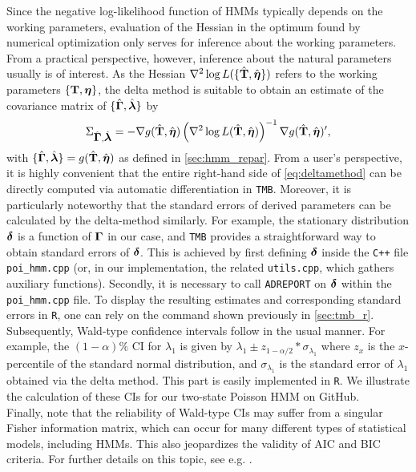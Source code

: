 \documentclass[bimj,fleqn]{w-art}\usepackage[]{graphicx}\usepackage[]{color}
\newcommand{\bct}{{\bf T}}
\newcommand{\bgamma}{\mbox{\boldmath $\Gamma$}}
\newcommand{\bfeta}{\mbox{\boldmath $\eta$}}
\newcommand{\bfdelta}{\mbox{\boldmath $\delta$}}
\newcommand{\bflambda}{\mbox{\boldmath $\lambda$}}
\theoremstyle{plain}
\theoremstyle{definition}
\begin{document}
Since the negative log-likelihood function of HMMs typically depends on the working parameters, evaluation of the Hessian in the optimum found by numerical optimization only serves for inference about the working parameters. From a practical perspective, however, inference about the natural parameters usually is of interest. As the Hessian $\nabla^2\log L(\{\hat{\bct}, \hat{\bfeta}\})$ refers to the working parameters $\{\bct, \bfeta\}$, the delta method is suitable to obtain an estimate of the covariance matrix of $\{\hat{\bgamma}, \hat{\bflambda}\}$ by
\begin{equation}
\Sigma_{\hat{\bgamma}, \hat{\bflambda}} = - \nabla g(\hat{\bct}, \hat{\bfeta})\left(\nabla^2\log L(\hat{\bct}, \hat{\bfeta})\right)^{-1}\nabla g(\hat{\bct}, \hat{\bfeta})^\prime,
\label{eq:deltamethod}
\end{equation}
with $\{\hat{\bgamma}, \hat{\bflambda}\} = g(\hat{\bct}, \hat{\bfeta})$ as defined in \autoref{sec:hmm_repar}.
From a user's perspective, it is highly convenient that the entire right-hand side of \autoref{eq:deltamethod} can be directly computed via automatic differentiation in \texttt{TMB}. Moreover, it is particularly noteworthy that the standard errors of derived parameters can be calculated by the delta-method similarly. For example, the stationary distribution $\bfdelta$ is a function of $\bgamma$ in our case, and \texttt{TMB} provides a straightforward way to obtain standard errors of $\bfdelta$. This is achieved by first defining $\bfdelta$ inside the {\tt{C++}} file \texttt{poi\_hmm.cpp} (or, in our implementation, the related \texttt{utils.cpp}, which gathers auxiliary functions). Secondly, it is necessary to call \texttt{ADREPORT} on $\bfdelta$ within the \texttt{poi\_hmm.cpp} file. To display the resulting estimates and corresponding standard errors in {\tt{R}}, one can rely on the command shown previously in \autoref{sec:tmb_r}.\\
Subsequently, Wald-type confidence intervals \citep{wald} follow in the usual manner. For example, the $(1 - \alpha) \%$ CI for $\lambda_1$ is given by $\lambda_1 \pm z_{1-\alpha/2} * \sigma_{\lambda_1}$ where $z_{x}$ is the $x$-percentile of the standard normal distribution, and $\sigma_{\lambda_1}$ is the standard error of $\lambda_1$ obtained via the delta method. This part is easily implemented in {\tt{R}}. We illustrate the calculation of these CIs for our two-state Poisson HMM on GitHub.\\

Finally, note that the reliability of Wald-type CIs may suffer from a singular Fisher information matrix, which can occur for many different types of statistical models, including HMMs. This also jeopardizes the validity of AIC and BIC criteria. For further details on this topic, see e.g. \citet{drton}.
\end{document}
